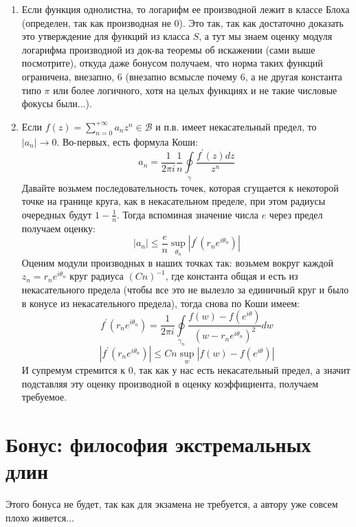 \documentclass[12pt,a4paper]{article} %
\begin{document}
\begin{enumerate}
		$$\leq\frac{q}{q-1}\sum_{m=0}^{+\infty}m|z|^m=\frac{q}{q-1}\frac{|z|}{(1-|z|)^2}$$
		То есть $|g^{'}(z)|(1-|z|^2)\leq\frac{q}{q-1}(1+|z|)$
		\item Если функция однолистна, то логарифм ее производной лежит в классе Блоха (определен, так как производная не 0). Это так, так как достаточно доказать это утверждение для функций из класса $S$, а тут мы знаем оценку модуля логарифма производной из док-ва теоремы об искажении (сами выше посмотрите), откуда даже бонусом получаем, что норма таких функций ограничена, внезапно, 6 (внезапно всмысле почему 6, а не другая константа типо $\pi$ или более логичного, хотя на целых функциях и не такие числовые фокусы были...).
		\item Если $f(z)=\displaystyle\sum_{n=0}^{+\infty}a_nz^n\in\mathcal{B}$ и п.в. имеет некасательный предел, то $|a_n|\rightarrow0$. Во-первых, есть формула Коши:
		$$a_n=\frac{1}{2\pi i}\frac{1}{n}\oint\limits_{\gamma}\frac{f^{'}(z)dz}{z^n}$$
		Давайте возьмем последовательность точек, которая сгущается к некоторой точке на границе круга, как в некасательном пределе, при этом радиусы очередных будут $1-\frac{1}{n}$. Тогда вспоминая значение числа $e$ через предел получаем оценку:
		$$|a_n|\leq \frac{e}{n}\sup\limits_{\theta_n}|f^{'}(r_ne^{i\theta_n})|$$
		Оценим модули производных в наших точках так: возьмем вокруг каждой $z_n=r_ne^{i\theta_n}$ круг радиуса $(Cn)^{-1}$, где константа общая и есть из некасательного предела (чтобы все это не вылезло за единичный круг и было в конусе из некасательного предела), тогда снова по Коши имеем:
		$$f^{'}(r_ne^{i\theta_n})=\frac{1}{2\pi i}\oint\limits_{\gamma_n}\frac{f(w)-f(e^{i\theta})}{(w-r_ne^{i\theta_n})^2}dw$$
		$$|f^{'}(r_ne^{i\theta_n})|\leq Cn\sup\limits_{w}|f(w)-f(e^{i\theta})|$$
		И супремум стремится к 0, так как у нас есть некасательный предел, а значит подставляя эту оценку производной в оценку коэффициента, получаем требуемое.
	\end{enumerate}
	\section{Бонус: философия экстремальных длин}
	Этого бонуса не будет, так как для экзамена не требуется, а автору уже совсем плохо живется...
	\newpage
\end{document}
